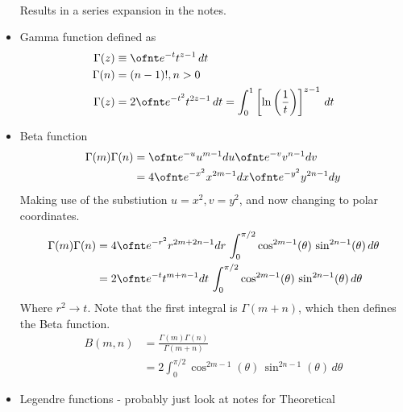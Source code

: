 \documentclass[cplx.tex]{subfiles}
\begin{document}
\begin{itemize}
\begin{gather}
        \end{gather}
        Results in a series expansion in the notes.
    \item Gamma function defined as
        \begin{align}
            \Gamma(z) &\equiv \ofnt e^{-t}t^{z-1}\,dt \\
            \Gamma(n) &= (n-1)!, n > 0 \\
            \Gamma(z) &= 2\ofnt e^{-t^2}t^{2z-1}\,dt = \int_0^1 \left[\ln\left(\frac{1}{t}\right)\right]^{z-1}\,dt
        \end{align}
    \item Beta function
        \begin{align}
            \Gamma(m)\Gamma(n) &=  \ofnt e^{-u}u^{m-1}du \ofnt e^{-v}v^{n-1}dv \\
                               &= 4 \ofnt e^{-x^2}x^{2m-1}dx \ofnt e^{-y^2}y^{2n-1}dy
        \end{align}
        Making use of the substiution $u = x^2, v = y^2$, and now changing to polar coordinates.
        \begin{align}
            \Gamma(m)\Gamma(n) &= 4\ofnt e^{-r^2}r^{2m+2n-1}dr\, \int_0^{\pi/2} \cos^{2m-1}(\theta)\,\sin^{2n-1}(\theta)\,d\theta \\
                               &= 2\ofnt e^{-t}t^{m+n-1}dt\, \int_0^{\pi/2} \cos^{2m-1}(\theta)\,\sin^{2n-1}(\theta)\,d\theta
        \end{align}
        Where $r^2 \to t$. Note that the first integral is $\Gamma(m+n)$, which then defines the Beta function. 
        \begin{align} 
            B(m,n) &= \frac{\Gamma(m)\Gamma(n)}{\Gamma(m+n)} \\
                   &= 2\int_0^{\pi/2} \cos^{2m-1}(\theta)\,\sin^{2n-1}(\theta)\,d\theta
        \end{align}
    \item Legendre functions - probably just look at notes for Theoretical
\end{itemize}
\end{document}
